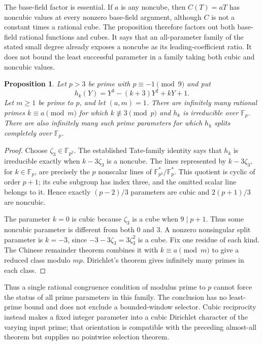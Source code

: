 \documentclass[11pt]{article}
\newtheorem{proposition}[theorem]{Proposition}
\theoremstyle{definition}
\theoremstyle{remark}
\begin{document}
The base-field factor is essential.  If $a$ is any noncube, then
$C(T)=aT$ has noncubic values at every nonzero base-field argument,
although $C$ is not a constant times a rational cube.  The proposition
therefore factors out both base-field rational functions and cubes.
It says that an all-parameter family of the stated small degree already
exposes a noncube as its leading-coefficient ratio.  It does not bound
the least successful parameter in a family taking both cubic and
noncubic values.

\begin{proposition}\label{prop:prime-parameter-congruence}
Let $p>3$ be prime with $p\equiv-1\pmod9$ and put
\[
 h_k(Y)=Y^3-(k+3)Y^2+kY+1.
\]
Let $m\ge1$ be prime to $p$, and let $(a,m)=1$.
There are infinitely many rational primes $k\equiv a\pmod m$
for which $k\not\equiv3\pmod p$ and $h_k$ is irreducible
over $\mathbb F_p$.  There are also infinitely many such prime
parameters for which $h_k$ splits completely over $\mathbb F_p$.
\end{proposition}

\begin{proof}
Choose $\zeta_3\in\mathbb F_{p^2}$.  The established Tate-family
identity says that $h_k$ is irreducible exactly when
$k-3\zeta_3$ is a noncube.  The lines represented by
$k-3\zeta_3$, for $k\in\mathbb F_p$, are precisely the
$p$ nonscalar lines of
$\mathbb F_{p^2}^*/\mathbb F_p^*$.
This quotient is cyclic of order $p+1$; its cube subgroup has
index three, and the omitted scalar line belongs to it.
Hence exactly $(p-2)/3$ parameters are cubic and
$2(p+1)/3$ are noncubic.

The parameter $k=0$ is cubic because $\zeta_3$ is a cube when
$9\mid p+1$.  Thus some noncubic parameter is different from
both $0$ and $3$.  A nonzero nonsingular split parameter is
$k=-3$, since $-3-3\zeta_3=3\zeta_3^2$ is a cube.
Fix one residue of each kind.  The Chinese remainder theorem combines
it with $k\equiv a\pmod m$ to give a reduced class modulo $mp$.
Dirichlet's theorem gives infinitely many primes in each class.
\end{proof}

Thus a single rational congruence condition of modulus prime to $p$
cannot force the status of all prime parameters in this family.
The conclusion has no least-prime bound and does not exclude a
bounded-window selector.  Cubic reciprocity instead makes a fixed
integer parameter into a cubic Dirichlet character of the varying
input prime; that orientation is compatible with the preceding
almost-all theorem but supplies no pointwise selection theorem.
\end{document}
